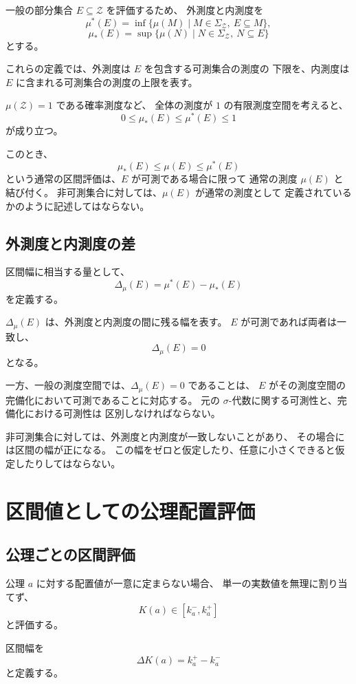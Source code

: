 \documentclass[a4paper,12pt]{article}
\begin{document}
一般の部分集合 $E\subseteq\mathcal{Z}$ を評価するため、
外測度と内測度を
\[
    \mu^*(E)
    =
    \inf\{\mu(M)\mid M\in\Sigma_{\mathcal{Z}},\
    E\subseteq M\},
\]
\[
    \mu_*(E)
    =
    \sup\{\mu(N)\mid N\in\Sigma_{\mathcal{Z}},\
    N\subseteq E\}
\]
とする。

これらの定義では、外測度は $E$ を包含する可測集合の測度の
下限を、内測度は $E$ に含まれる可測集合の測度の上限を表す。

$\mu(\mathcal{Z})=1$ である確率測度など、
全体の測度が $1$ の有限測度空間を考えると、
\[
    0\leq\mu_*(E)\leq\mu^*(E)\leq1
\]
が成り立つ。

このとき、
\[
    \mu_*(E)\leq\mu(E)\leq\mu^*(E)
\]
という通常の区間評価は、$E$ が可測である場合に限って
通常の測度 $\mu(E)$ と結び付く。
非可測集合に対しては、$\mu(E)$ が通常の測度として
定義されているかのように記述してはならない。

\subsection{外測度と内測度の差}

区間幅に相当する量として、
\[
    \Delta_{\mu}(E)
    =
    \mu^*(E)-\mu_*(E)
\]
を定義する。

$\Delta_{\mu}(E)$ は、外測度と内測度の間に残る幅を表す。
$E$ が可測であれば両者は一致し、
\[
    \Delta_{\mu}(E)=0
\]
となる。

一方、一般の測度空間では、$\Delta_{\mu}(E)=0$ であることは、
$E$ がその測度空間の完備化において可測であることに対応する。
元の $\sigma$-代数に関する可測性と、完備化における可測性は
区別しなければならない。

非可測集合に対しては、外測度と内測度が一致しないことがあり、
その場合には区間の幅が正になる。
この幅をゼロと仮定したり、任意に小さくできると仮定したりしてはならない。

\section{区間値としての公理配置評価}

\subsection{公理ごとの区間評価}

公理 $a$ に対する配置値が一意に定まらない場合、
単一の実数値を無理に割り当てず、
\[
    K(a)\in[k_a^-,k_a^+]
\]
と評価する。

区間幅を
\[
    \Delta K(a)=k_a^+-k_a^-
\]
と定義する。
\end{document}
